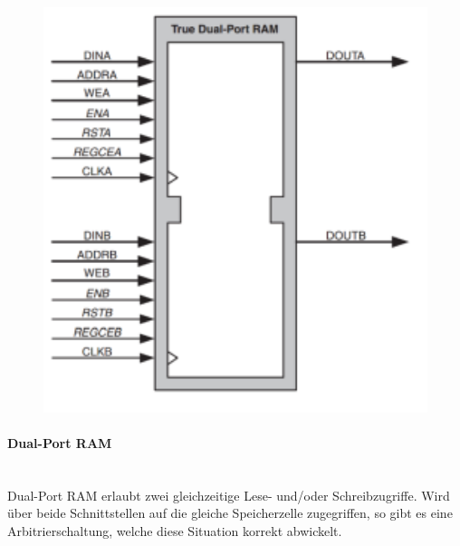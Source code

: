 \begin{minipage}{0.3\textwidth}
    \begin{figure}[H]
        \includegraphics[width=1\textwidth]{images/dualportram.png}
    \end{figure}
\end{minipage}
\hfill
\begin{minipage}{0.65\textwidth}
    \paragraph{Dual-Port RAM}$~$ \\
    Dual-Port RAM erlaubt zwei gleichzeitige Lese- und/oder Schreibzugriffe. Wird über beide Schnittstellen auf die gleiche Speicherzelle zugegriffen, so gibt es eine Arbitrierschaltung, welche diese Situation korrekt abwickelt. \ \\ \ \\ \ \\ \ \\ \ \\ \ \\ \ \\ \ \\ \ \\ \ \\
\end{minipage}



